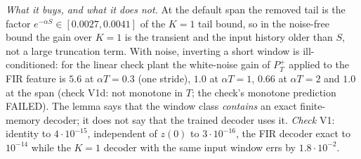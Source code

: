 \noindent\emph{What it buys, and what it does not.} At the default span the removed tail is the factor
$e^{-\alpha S}\in[0.0027,0.0041]$ of the $K=1$ tail bound, so in the noise-free bound the gain over $K=1$ is the
transient and the input history older than $S$, not a large truncation term. With noise, inverting a short window is
ill-conditioned: for the linear check plant the white-noise gain of $P_T^+$ applied to the FIR feature is $5.6$ at
$\alpha T=0.3$ (one stride), $1.0$ at $\alpha T=1$, $0.66$ at $\alpha T=2$ and $1.0$ at the span (check V1d: not
monotone in $T$; the check's monotone prediction FAILED). The lemma says that the window class \emph{contains} an exact
finite-memory decoder; it does not say that the trained decoder uses it. \emph{Check} V1: identity to $4\cdot10^{-15}$,
independent of $z(0)$ to $3\cdot10^{-16}$, the FIR decoder exact to $10^{-14}$ while the $K=1$ decoder with the same input
window errs by $1.8\cdot10^{-2}$.


